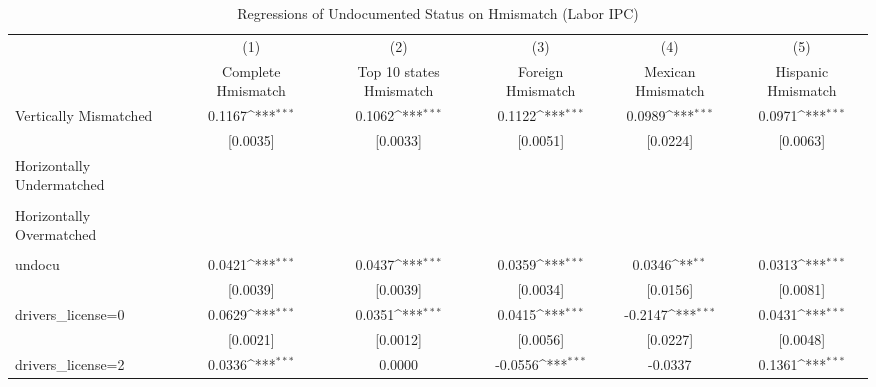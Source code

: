 \begin{table}[htbp]\centering
\def\sym#1{\ifmmode^{#1}\else\(^{#1}\)\fi}
\caption{Regressions of Undocumented Status on Hmismatch (Labor IPC)}
\begin{tabular}{l*{5}{c}}
\toprule
                    &\multicolumn{1}{c}{(1)}         &\multicolumn{1}{c}{(2)}         &\multicolumn{1}{c}{(3)}         &\multicolumn{1}{c}{(4)}         &\multicolumn{1}{c}{(5)}         \\
                    &Complete Hmismatch         &Top 10 states Hmismatch         &Foreign Hmismatch         &Mexican Hmismatch         &Hispanic Hmismatch         \\
\midrule
Vertically Mismatched&      0.1167\sym{***}&      0.1062\sym{***}&      0.1122\sym{***}&      0.0989\sym{***}&      0.0971\sym{***}\\
                    &    [0.0035]         &    [0.0033]         &    [0.0051]         &    [0.0224]         &    [0.0063]         \\
\addlinespace
Horizontally Undermatched&                     &                     &                     &                     &                     \\
                    &                     &                     &                     &                     &                     \\
\addlinespace
Horizontally Overmatched&                     &                     &                     &                     &                     \\
                    &                     &                     &                     &                     &                     \\
\addlinespace
undocu              &      0.0421\sym{***}&      0.0437\sym{***}&      0.0359\sym{***}&      0.0346\sym{**} &      0.0313\sym{***}\\
                    &    [0.0039]         &    [0.0039]         &    [0.0034]         &    [0.0156]         &    [0.0081]         \\
\addlinespace
drivers\_license=0   &      0.0629\sym{***}&      0.0351\sym{***}&      0.0415\sym{***}&     -0.2147\sym{***}&      0.0431\sym{***}\\
                    &    [0.0021]         &    [0.0012]         &    [0.0056]         &    [0.0227]         &    [0.0048]         \\
\addlinespace
drivers\_license=2   &      0.0336\sym{***}&      0.0000         &     -0.0556\sym{***}&     -0.0337         &      0.1361\sym{***}\\

\end{tabular}
\end{table}
